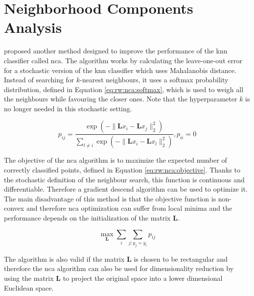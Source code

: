 \documentclass[12pt,a4paper]{report}
\begin{document}

\section{Neighborhood Components Analysis} \label{chap:rw:nca}
\cite{jacobgoldberger2004neighbourhood} proposed another method designed to improve the performance of the \ac{knn} classifier called \acf{nca}. The algorithm works by calculating the leave-one-out error for a stochastic version of the \ac{knn} classifier which uses Mahalanobis distance. Instead of searching for $k$-nearest neighbours, it uses a softmax probability distribution, defined in Equation \ref{eq:rw:nca:softmax}, which is used to weigh all the neighbours while favouring the closer ones. Note that the hyperparameter $k$ is no longer needed in this stochastic setting.

\begin{equation}
p_{ij} = \frac{ \exp(-\lVert \bm{L}x_i-\bm{L}x_j \rVert_2^2) }{ \sum_{l \neq i} \exp(-\lVert \bm{L}x_i-\bm{L}x_l \rVert_2^2) }, p_{ii}=0 \label{eq:rw:nca:softmax}
\end{equation}

The objective of the \ac{nca} algorithm is to maximize the expected number of correctly classified points, defined in Equation \ref{eq:rw:nca:objective}. Thanks to the stochastic definition of the neighbour search, this function is continuous and differentiable. Therefore a gradient descend algorithm can be used to optimize it. The main disadvantage of this method is that the objective function is non-convex and therefore \ac{nca} optimization can suffer from local minima and the performance depends on the initialization of the matrix $\bm{L}$. 

\begin{equation}
\max_{\bm{L}} \sum_i \sum_{j:y_j=y_i} p_{ij} \label{eq:rw:nca:objective}
\end{equation}

The algorithm is also valid if the matrix $\bm{L}$ is chosen to be rectangular and therefore the \ac{nca} algorithm can also be used for dimensionality reduction by using the matrix $\bm{L}$ to project the original space into a lower dimensional Euclidean space.
\end{document}
